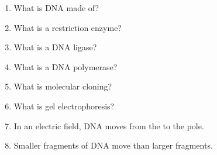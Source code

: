 \begin{enumerate}
\def\labelenumi{\arabic{enumi}.}
\tightlist
\item
  What is DNA made of?
\item
  What is a restriction enzyme?
\item
  What is a DNA ligase?
\item
  What is a DNA polymerase?
\item
  What is molecular cloning?
\item
  What is gel electrophoresis?
\item
  In an electric field, DNA moves from the \underline{\phantom{answer}} to
  the \underline{\phantom{answer}} pole.
\item
  Smaller fragments of DNA move \underline{\phantom{answer}} than larger
  fragments.
\end{enumerate}
